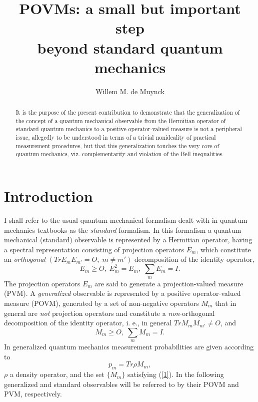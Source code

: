 \documentclass{ws-procs975x65}
\begin{document}
\title{POVMs: a small but important step\\beyond standard quantum mechanics}

\author{Willem M. de Muynck}

\address{Theoretical Physics,
Eindhoven University of Technology\\
Eindhoven, the Netherlands,\\
E-mail: w.m.d.muijnck@tue.nl\\
http://www.phys.tue.nl/ktn/Wim/muynck.htm}



\begin{abstract}
It is the purpose of the present contribution to demonstrate that
the generalization of the concept of a quantum mechanical
observable from the Hermitian operator of standard quantum
mechanics to a positive operator-valued measure is not a
peripheral issue, allegedly to be understood in terms of a trivial
nonideality of practical measurement procedures, but that this
generalization touches the very core of quantum mechanics, viz.
complementarity and violation of the Bell inequalities.
\end{abstract}


\bodymatter

\section{Introduction}\label{sec1}
I shall refer to the usual quantum mechanical formalism dealt with
in quantum mechanics textbooks as the \textit{standard} formalism.
In this formalism a quantum mechanical (standard) observable is
represented by a Hermitian operator, having a spectral
representation consisting of projection operators $E_m$, which
constitute an \textit{orthogonal} $(Tr E_mE_{m'} = O,\; m\neq m')$
decomposition of the identity operator,
\[E_{m}\geq O,\; E_m^2 =E_m,\;\sum_{m} E_{m} = I.\]
The projection operators $E_m$ are said to generate a
projection-valued measure (PVM). A \textit{generalized} observable
is represented by a positive operator-valued measure (POVM),
generated by a set of non-negative operators $M_m$ that in general
are \textit{not} projection operators and constitute a
\textit{non}-orthogonal decomposition of the identity operator, i.
e., in general $Tr M_mM_{m'} \neq O$, and
\begin{equation}M_{m}\geq O, \;\sum_{m} M_{m} = I.\label{1}
\end{equation}
In generalized quantum mechanics measurement probabilities are
given according to
\begin{equation} p_m= Tr \rho M_m,\label{2}
\end{equation}
$\rho$ a density operator, and the set $\{M_m\}$ satisfying
(\ref{1}). In the following generalized and standard observables
will be referred to by their POVM and PVM, respectively.
\end{document}
